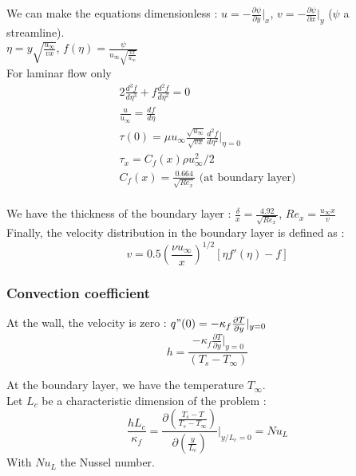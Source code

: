 \documentclass[../main.tex]{subfiles}
\begin{document}
We can make the equations dimensionless : $u = -\frac{\partial \psi}{\partial y}\lvert_x$, $v = -\frac{\partial \psi}{\partial x}\lvert_y$ ($\psi$ a streamline).\\

$\eta = y \sqrt{\frac{u_\infty}{v x}}$, $f(\eta) = \frac{\psi}{u_\infty \sqrt{\frac{vx}{u_\infty}}}$\\
\warning For laminar flow only
\begin{equation}
    \begin{gathered}
        2 \frac{d^3f}{d\eta^3} + f \frac{d^2 f}{d\eta^2} = 0\\
        \frac{u}{u_\infty} = \frac{df}{d\eta}\\
        \tau(0) = \mu u_\infty \frac{\sqrt{u_\infty}}{\sqrt{vx}} \frac{d^2 f}{d\eta^2}\lvert_{\eta = 0}\\
        \tau_x = C_f(x) \rho u_\infty^2/2\\
        C_f(x) = \frac{0.664}{\sqrt{Re_x}} \text{ (at boundary layer)}\\
    \end{gathered}
\end{equation}




We have the thickness of the boundary layer : $\frac{\delta}{x} = \frac{4.92}{\sqrt{Re_x}}$, $Re_x = \frac{u_\infty x}{v}$\\

Finally, the velocity distribution in the boundary layer is defined as : \begin{equation}
    v = 0.5 (\frac{\nu u_\infty}{x})^{1/2} [\eta f'(\eta)-f]
\end{equation}

\subsubsection{Convection coefficient}
At the wall, the velocity is zero : $q"(0) = -\kappa_f \frac{\partial T}{\partial y}\lvert_{y=0}$\\

\begin{equation}
    h = \frac{-\kappa_f \frac{\partial T}{\partial y}\lvert_{y=0}}{(T_s-T_\infty)}
\end{equation}

At the boundary layer, we have the temperature $T_\infty$.\\
Let $L_c$ be a characteristic dimension of the problem : \begin{equation}
    \frac{h L_c}{\kappa_f} = \frac{\partial (\frac{T_s-T}{T_s-T_\infty})}{\partial (\frac{y}{L_c})}\lvert_{y/L_c = 0} = N u_L
\end{equation}
With $Nu_L$ the Nussel number.\\
\end{document}
